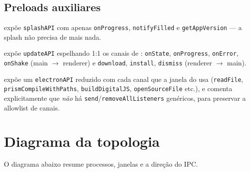 \subsection{Preloads auxiliares}

\begin{description}[leftmargin=*]
  \item[\file{preload_splash.js}] expõe \lstinline|splashAPI| com apenas
    \lstinline|onProgress|, \lstinline|notifyFilled| e \lstinline|getAppVersion|
    --- a splash não precisa de mais nada.
  \item[\file{preload_update.js}] expõe \lstinline|updateAPI| espelhando 1:1 os
    canais de : \lstinline|onState|, \lstinline|onProgress|,
    \lstinline|onError|, \lstinline|onShake| (main $\to$ renderer) e
    \lstinline|download|, \lstinline|install|, \lstinline|dismiss|
    (renderer $\to$ main).
  \item[\file{preload_prism.js}] expõe um \lstinline|electronAPI| reduzido com
    cada canal que a janela do  usa (\lstinline|readFile|,
    \lstinline|prismCompileWithPaths|, \lstinline|buildDigitalJS|,
    \lstinline|openSourceFile| etc.), e comenta explicitamente que \emph{não} há
    \lstinline|send|/\lstinline|removeAllListeners| genéricos, para preservar a
    allowlist de canais.
\end{description}

\section{Diagrama da topologia}
\label{sec:05-diagrama}

O diagrama abaixo resume processos, janelas e a direção do IPC.

